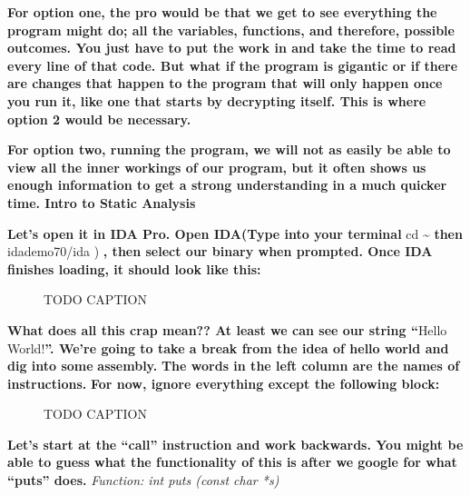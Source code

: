 \documentclass[letterpaper]{article}
\newcommand{\sitfig}[3]{
\begin{figure}[H]
\centering
\makebox[\textwidth][c]{
#2
}
\caption{#3}
\label{#1}
\end{figure}
}
\newcommand{\sitgfx}[4][scale=1.0]{
\sitfig{#3}{\texttt{[image: \#2]}}{#4}
}
\begin{document}
\textbf{For option one, the pro would be that we get to see everything the program might do; all the variables,
functions, and therefore, possible outcomes. You just have to put the work in and take the time to read every line of
that code. But what if the program is gigantic or if there are changes that happen to the program that will only happen
once you run it, like one that starts by decrypting itself. This is where option 2 would be necessary. }

{\centering
\textbf{\newline
For option two, running the program, we will not as easily be able to view all the inner workings of our program, but it
often shows us enough information to get a strong understanding in a much quicker time. \newline
\newline
Intro to Static Analysis}
\par}

\textbf{Let's open it in IDA Pro. Open IDA(Type into your terminal }cd \~{} \textbf{then }idademo70/ida )\textbf{ , then
select our binary when prompted. \newline
Once IDA finishes loading, it should look like this: }

{\centering   
\sitgfx[width=5.3957in,height=5.052in]{FINALWORKINGDOCFORMERLYPRECURSOR-img009.png}{fig:unk}{TODO CAPTION}
 \par}
\textbf{What does all this crap mean?? At least we can see our string ``}Hello World!\textbf{{}''. \newline
We're going to take a break from the idea of hello world and dig into some
}\textbf{\textcolor[rgb]{0.07450981,0.30980393,0.36078432}{assembly.}}\textbf{ The words in the left column are the
names of }\textbf{\textcolor[rgb]{0.21960784,0.4627451,0.11372549}{instructions.}}\textbf{ For now, ignore everything
except the following block:}

{\centering
\textbf{\newline
\newline
 }  
\sitgfx[width=4.8126in,height=1.0209in]{FINALWORKINGDOCFORMERLYPRECURSOR-img010.png}{fig:unk}{TODO CAPTION}
 
\par}

\textbf{Let's start at the ``call'' instruction and work backwards. You might be able to guess what the functionality of
this is after we google for what ``puts'' does.\newline
\newline
}\textit{Function: int puts (const char *s)}
\end{document}
